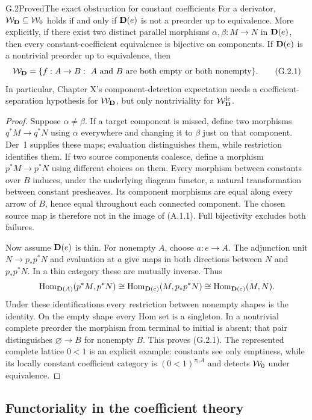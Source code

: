 \begin{claim}{G.2}{Proved}{The exact obstruction for constant coefficients}
For a derivator, $\mathcal W_{\mathbf D}\subseteq\mathcal W_0$ holds if and only if
$\mathbf D(e)$ is not a preorder up to equivalence. More explicitly, if
there exist two distinct parallel morphisms $\alpha,\beta:M\to N$
in $\mathbf D(e)$, then every constant-coefficient equivalence is bijective
on components. If $\mathbf D(e)$ is a nontrivial preorder up to equivalence,
then
\[
 \mathcal W_{\mathbf D}=\{f:A\to B:\ A\text{ and }B\text{ are both empty or both nonempty}\}.
 \tag{G.2.1}
\]
In particular, Chapter X's component-detection expectation needs a
coefficient-separation hypothesis for $\mathcal W_{\mathbf D}$, but only nontriviality
for $\mathcal W_{\mathbf D}^{\mathrm{lc}}$.
\end{claim}
\begin{proof}
Suppose $\alpha\ne\beta$. If a target component is missed, define
two morphisms $q^*M\to q^*N$ using $\alpha$ everywhere and changing
it to $\beta$ just on that component. Der~1 supplies these maps;
evaluation distinguishes them, while restriction identifies them.
If two source components coalesce, define a morphism $p^*M\to p^*N$
using different choices on them. Every morphism between constants
over $B$ induces, under the underlying diagram functor, a natural
transformation between constant presheaves. Its component morphisms
are equal along every arrow of $B$, hence equal throughout each
connected component. The chosen source map is therefore not in the
image of (A.1.1). Full bijectivity excludes both failures.

Now assume $\mathbf D(e)$ is thin. For nonempty $A$, choose $a:e\to A$.
The adjunction unit $N\to p_*p^*N$ and evaluation at $a$ give maps
in both directions between $N$ and $p_*p^*N$. In a thin category
these are mutually inverse. Thus
\[
 \operatorname{Hom}_{\mathbf D(A)}(p^*M,p^*N)
 \cong\operatorname{Hom}_{\mathbf D(e)}(M,p_*p^*N)
 \cong\operatorname{Hom}_{\mathbf D(e)}(M,N).
\]
Under these identifications every restriction between nonempty
shapes is the identity. On the empty shape every Hom set is a
singleton. In a nontrivial complete preorder the morphism from
terminal to initial is absent; that pair distinguishes
$\varnothing\to B$ for nonempty $B$. This proves (G.2.1).
The represented complete lattice $0<1$ is an explicit example:
constants see only emptiness, while its locally constant coefficient
category is $(0<1)^{\pi_0A}$ and detects $\mathcal W_0$ under equivalence.
\end{proof}

\subsection{Functoriality in the coefficient theory}


